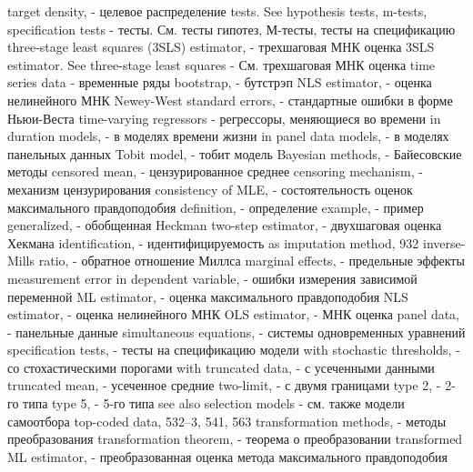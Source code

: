 target density, - целевое распределение
tests. See hypothesis tests, m-tests, specification tests - тесты. См. тесты гипотез, М-тесты, тесты на спецификацию
three-stage least squares (3SLS) estimator, - трехшаговая МНК оценка
3SLS estimator. See three-stage least squares - См. трехшаговая МНК оценка
time series data - временные ряды
bootstrap, - бутстрэп
NLS estimator, - оценка нелинейного МНК
Newey-West standard errors, - стандартные ошибки в форме Ньюи-Веста
time-varying regressors - регрессоры, меняющиеся во времени
in duration models, - в моделях времени жизни
in panel data models, - в моделях панельных данных
Tobit model, - тобит модель
Bayesian methods, - Байесовские методы 
censored mean, - цензурированное среднее
censoring mechanism, - механизм цензурирования
consistency of MLE, - состоятельность оценок максимального правдоподобия
definition, - определение
example, - пример
generalized, - обобщенная
Heckman two-step estimator, - двухшаговая оценка Хекмана 
identification, - идентифицируемость
as imputation method, 932
inverse-Mills ratio, - обратное отношение Миллса
marginal effects, - предельные эффекты
measurement error in dependent variable, - ошибки измерения зависимой переменной
ML estimator, - оценка максимального правдоподобия
NLS estimator, - оценка нелинейного МНК
OLS estimator, - МНК оценка
panel data, - панельные данные
simultaneous equations, - системы одновременных уравнений
specification tests, - тесты на спецификацию модели
with stochastic thresholds, - со стохастическими порогами
with truncated data, - с усеченными данными
truncated mean, - усеченное средние
two-limit, - с двумя границами
type 2, - 2-го типа
type 5, - 5-го типа
see also selection models - см. также модели самоотбора
top-coded data, 532–3, 541, 563 
transformation methods, - методы преобразования
transformation theorem, - теорема о преобразовании
transformed ML estimator, - преобразованная оценка метода максимального правдоподобия

